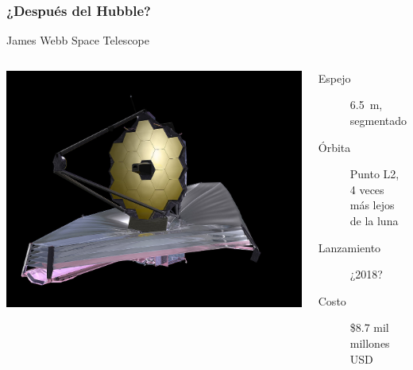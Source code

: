 \documentclass{beamer}
\begin{document}
\begin{frame}
  \frametitle{¿Después del Hubble?}
  \begin{block}{James Webb Space Telescope}
    \begin{columns}\small
      \includegraphics[width=1.5\linewidth]{1280px-James_Webb_Space_Telescope_2009_top}
      \begin{description}
      \item[Espejo] 6.5~m, segmentado
      \item[Órbita] Punto L2, 4 veces más lejos de la luna
      \item[Lanzamiento] ¿2018?
      \item[Costo] \$8.7 mil millones USD
      \end{description}
    \end{columns}
  \end{block}

\end{frame}
\end{document}
